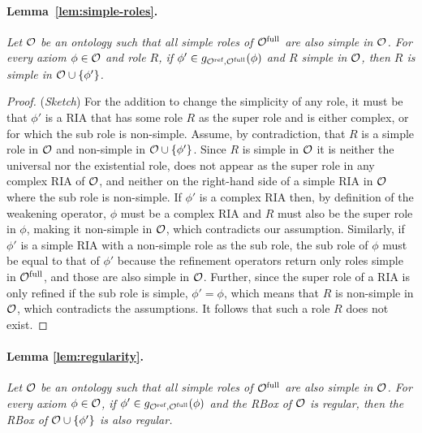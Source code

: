 \documentclass[
]{ceurart}
\begin{document}
\paragraph{Lemma~\ref{lem:simple-roles}.}
{\it Let $\mathcal{O}$ be an ontology such that all simple roles of ${\mathcal{O}^\textnormal{full}}$ are also simple in $\mathcal{O}$. For every axiom $\phi \in \mathcal{O}$ and role $R$, if $\phi' \in g_{{\mathcal{O}^\textnormal{ref}},{\mathcal{O}^\textnormal{full}}}(\phi)$ and $R$ simple in $\mathcal{O}$, then $R$ is simple in $\mathcal{O} \cup \{ \phi' \}$.
}

\begin{proof}(\emph{Sketch})
  For the addition to change the simplicity of any role, it must be that $\phi'$ is a RIA that has some role $R$ as the super role and is either complex, or for which the sub role is non-simple. Assume, by contradiction, that $R$ is a simple role in $\mathcal{O}$ and non-simple in $\mathcal{O} \cup \{ \phi' \}$. Since $R$ is simple in $\mathcal{O}$ it is neither the universal nor the existential role, does not appear as the super role in any complex RIA of $\mathcal{O}$, and neither on the right-hand side of a simple RIA in $\mathcal{O}$ where the sub role is non-simple. If $\phi'$ is a complex RIA then, by definition of the weakening operator, $\phi$ must be a complex RIA and $R$ must also be the super role in $\phi$, making it non-simple in $\mathcal{O}$, which contradicts our assumption. Similarly, if $\phi'$ is a simple RIA with a non-simple role as the sub role, the sub role of $\phi$ must be equal to that of $\phi'$ because the refinement operators return only roles simple in ${\mathcal{O}^\textnormal{full}}$, and those are also simple in $\mathcal{O}$. Further, since the super role of a RIA is only refined if the sub role is simple, $\phi' = \phi$, which means that $R$ is non-simple in $\mathcal{O}$, which contradicts the assumptions. It follows that such a role $R$ does not exist.
\end{proof}


\paragraph{Lemma \ref{lem:regularity}.}
{\it Let $\mathcal{O}$ be an ontology such that all simple roles of ${\mathcal{O}^\textnormal{full}}$ are also simple in $\mathcal{O}$. For every axiom $\phi \in \mathcal{O}$, if $\phi' \in g_{{\mathcal{O}^\textnormal{ref}},{\mathcal{O}^\textnormal{full}}}(\phi)$ and the RBox of $\mathcal{O}$ is regular, then the RBox of $\mathcal{O} \cup \{ \phi' \}$ is also regular.
  }
\end{document}
